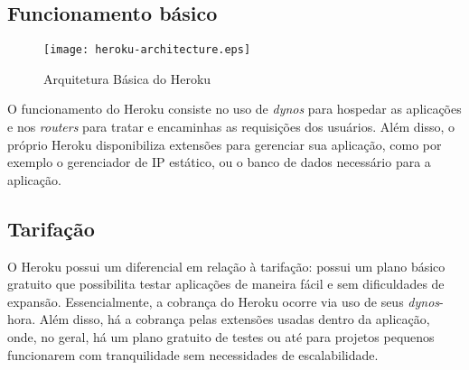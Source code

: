 \subsection{Funcionamento básico}

\begin{figure}[H]
  \centering
  \texttt{[image: heroku-architecture.eps]}
  \caption{Arquitetura Básica do Heroku\cite{safariheroku}}
  \label{fig:heroku-architecture}
\end{figure}

O funcionamento do Heroku consiste no uso de \textit{dynos} para hospedar as aplicações e nos \textit{routers} para tratar e encaminhas as requisições dos usuários. Além disso, o próprio Heroku disponibiliza extensões para gerenciar sua aplicação, como por exemplo o gerenciador de IP estático, ou o banco de dados necessário para a aplicação.

\subsection{Tarifação}

O Heroku possui um diferencial em relação à tarifação: possui um plano básico gratuito que possibilita testar aplicações de maneira fácil e sem dificuldades de expansão. Essencialmente, a cobrança do Heroku ocorre via uso de seus \textit{dynos}-hora. Além disso, há a cobrança pelas extensões usadas dentro da aplicação, onde, no geral, há um plano gratuito de testes ou até para projetos pequenos funcionarem com tranquilidade sem necessidades de escalabilidade.

